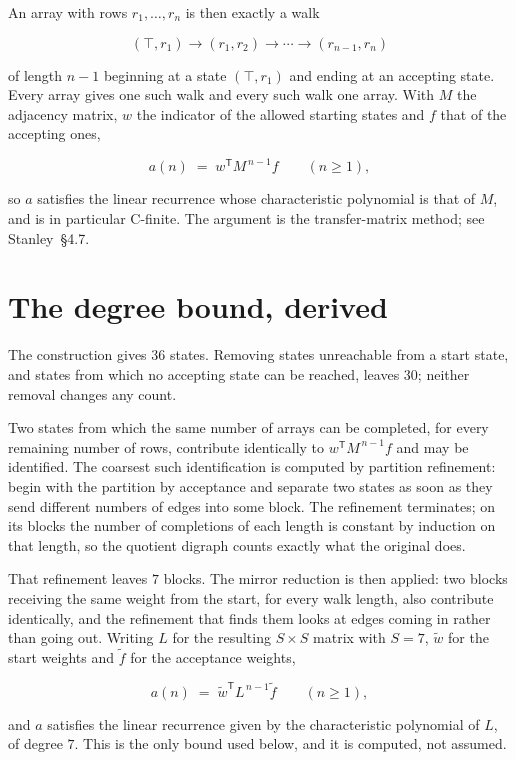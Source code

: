 \documentclass[11pt]{article}
\theoremstyle{definition}
\begin{document}
An array with rows $r_1,\dots,r_n$ is then exactly a walk

\[(\top,r_1) \to (r_1,r_2) \to \cdots \to (r_{n-1},r_n)\]

of length $n-1$ beginning at a state $(\top,r_1)$ and ending at an accepting state. Every array gives one such walk and every such walk one array. With $M$ the adjacency matrix, $w$ the indicator of the allowed starting states and $f$ that of the accepting ones,

\[a(n) \;=\; w^{\mathsf T} M^{\,n-1} f \qquad (n \ge 1),\]

so $a$ satisfies the linear recurrence whose characteristic polynomial is that of $M$, and is in particular C-finite. The argument is the transfer-matrix method; see Stanley~\S4.7.

\section{The degree bound, derived}

The construction gives $36$ states. Removing states unreachable from a start state, and states from which no accepting state can be reached, leaves $30$; neither removal changes any count.

Two states from which the same number of arrays can be completed, for every remaining number of rows, contribute identically to $w^{\mathsf T}M^{\,n-1}f$ and may be identified. The coarsest such identification is computed by partition refinement: begin with the partition by acceptance and separate two states as soon as they send different numbers of edges into some block. The refinement terminates; on its blocks the number of completions of each length is constant by induction on that length, so the quotient digraph counts exactly what the original does.

That refinement leaves $7$ blocks. The mirror reduction is then applied: two blocks receiving the same weight from the start, for every walk length, also contribute identically, and the refinement that finds them looks at edges coming in rather than going out. Writing $L$ for the resulting $S \times S$ matrix with $S = 7$, $\tilde w$ for the start weights and $\tilde f$ for the acceptance weights,

\[a(n) \;=\; \tilde w^{\mathsf T} L^{\,n-1} \tilde f \qquad (n \ge 1),\]

and $a$ satisfies the linear recurrence given by the characteristic polynomial of $L$, of degree $7$. This is the only bound used below, and it is computed, not assumed.
\end{document}
